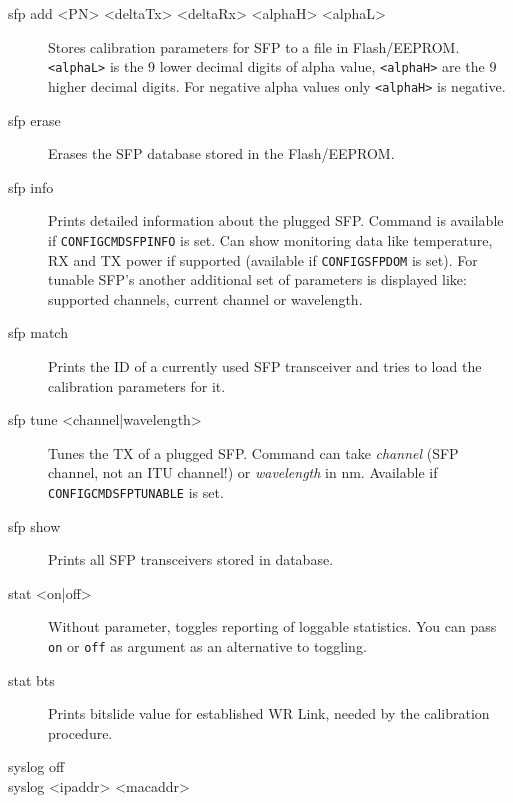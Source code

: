 \documentclass[a4paper, 12pt]{article}
\renewcommand{\_}{\underscore\allowbreak}
\newcommand{\code}[1]{\texttt{#1}}
\begin{document}
\begin{description}
\item[sfp add <PN> <deltaTx> <deltaRx> <alphaH> <alphaL>] \mbox{}

  Stores calibration parameters for SFP to a file in
  Flash/EEPROM. \code{<alphaL>} is the 9 lower decimal digits of alpha
  value, \code{<alphaH>} are the 9 higher decimal digits. For negative
  alpha values only \code{<alphaH>} is negative.

\item[sfp erase] \mbox{}

  Erases the SFP database stored in the Flash/EEPROM.

\item[sfp info] \mbox{}

  Prints detailed information about the plugged SFP.
  Command is available if \texttt{CONFIG\_CMD\_SFP\_INFO} is set.
  Can show monitoring data like temperature, RX and TX power if supported
  (available if \texttt{CONFIG\_SFP\_DOM} is set).
  For tunable SFP's another additional set of parameters is displayed like:
  supported channels, current channel or wavelength.

\item[sfp match] \mbox{}

  Prints the ID of a currently used SFP transceiver and tries to load
  the calibration parameters for it.

\item[sfp tune <channel|wavelength>] \mbox{}

  Tunes the TX of a plugged SFP. Command can take \textit{channel}
  (SFP channel, not an ITU channel!) or \textit{wavelength} in nm.
  Available if \texttt{CONFIG\_CMD\_SFP\_TUNABLE} is set.

\item[sfp show] \mbox{}

  Prints all SFP transceivers stored in database.

\item[stat <on|off>] \mbox{}

  Without parameter, toggles reporting of loggable statistics. You can
  pass \texttt{on} or \texttt{off} as argument as an alternative to
  toggling.

\item[stat bts] \mbox{}

  Prints bitslide value for established WR Link, needed by the
  calibration procedure.

\item[syslog off]

\item[syslog <ipaddr> <macaddr>] \mbox{}


\end{description}
\end{document}
